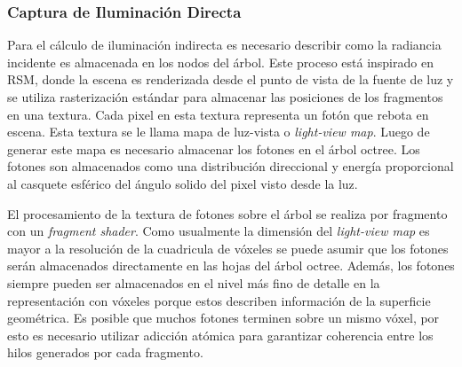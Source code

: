 \subsubsection{Captura de Iluminación Directa}
Para el cálculo de iluminación indirecta es necesario describir como la radiancia incidente es almacenada en los nodos del árbol. Este proceso está inspirado en \ac{RSM}, donde la escena es renderizada desde el punto de vista de la fuente de luz y se utiliza rasterización estándar para almacenar las posiciones de los fragmentos en una textura. Cada pixel en esta textura representa un fotón que rebota en escena. Esta textura se le llama mapa de luz-vista o \emph{light-view map}. Luego de generar este mapa es necesario almacenar los fotones en el árbol octree. Los fotones son almacenados como una distribución direccional y energía proporcional al casquete esférico del ángulo solido del pixel visto desde la luz.

El procesamiento de la textura de fotones sobre el árbol se realiza por fragmento con un \emph{fragment shader}. Como usualmente la dimensión del \emph{light-view map} es mayor a la resolución de la cuadricula de vóxeles se puede asumir que los fotones serán almacenados directamente en las hojas del árbol octree. Además, los fotones siempre pueden ser almacenados en el nivel más fino de detalle en la representación con vóxeles porque estos describen información de la superficie geométrica. Es posible que muchos fotones terminen sobre un mismo vóxel, por esto es necesario utilizar adicción atómica para garantizar coherencia entre los hilos generados por cada fragmento.
